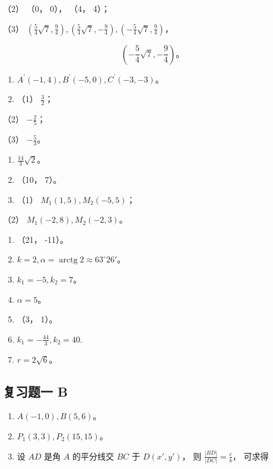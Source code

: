 （2） （0， 0）， （4， 4）；

（3）
\(\left(\frac{5}{4}\sqrt{7}, \frac{9}{4}\right), \left(\frac{5}{4}\sqrt{7}, -\frac{9}{4}\right), \left(-\frac{5}{4}\sqrt{7}, \frac{9}{4}\right)\)，

\[
\left(- \frac {5}{4} \sqrt {7}, - \frac {9}{4}\right)\text{。}
\]

\begin{enumerate}
\def\labelenumi{\arabic{enumi}.}
\setcounter{enumi}{1}
\item
  \(A^{\prime}(-1,4), B^{\prime}(-5,0), C^{\prime}(-3,-3)\)。
\item
  （1） \(\frac{3}{2}\)；
\end{enumerate}

（2） \(-\frac{2}{5}\)；

（3） \(-\frac{5}{3}\)。

\begin{enumerate}
\def\labelenumi{\arabic{enumi}.}
\setcounter{enumi}{3}
\item
  \(\frac{14}{3}\sqrt{2}\)。
\item
  （10， 7）。
\item
  （1） \(M_{1}(1,5), M_{2}(-5,5)\)；
\end{enumerate}

（2） \(M_{1}(-2,8), M_{2}(-2,3)\)。

\begin{enumerate}
\def\labelenumi{\arabic{enumi}.}
\setcounter{enumi}{6}
\item
  （21， -11）。
\item
  \(k = 2, \alpha = \operatorname{arctg} 2 \approx 63^{\circ}26'\)。
\item
  \(k_{1} = -5, k_{2} = 7\)。
\item
  \(\alpha = 5\)。
\item
  （3， 1）。
\item
  \(k_{1} = -\frac{44}{3}, k_{2} = 40.\)
\item
  \(r = 2\sqrt{6}\)。
\end{enumerate}

\subsection{复习题一 B}\label{ux590dux4e60ux9898ux4e00-b-1}

\begin{enumerate}
\def\labelenumi{\arabic{enumi}.}
\item
  \(A(-1,0), B(5,6)\)。
\item
  \(P_{1}(3,3), P_{2}(15,15)\)。
\item
  设 \(AD\) 是角 \(A\) 的平分线交 \(BC\) 于 \(D(x', y')\)， 则
  \(\frac{|BD|}{|DC|} = \frac{c}{b}\)， 可求得
\end{enumerate}

